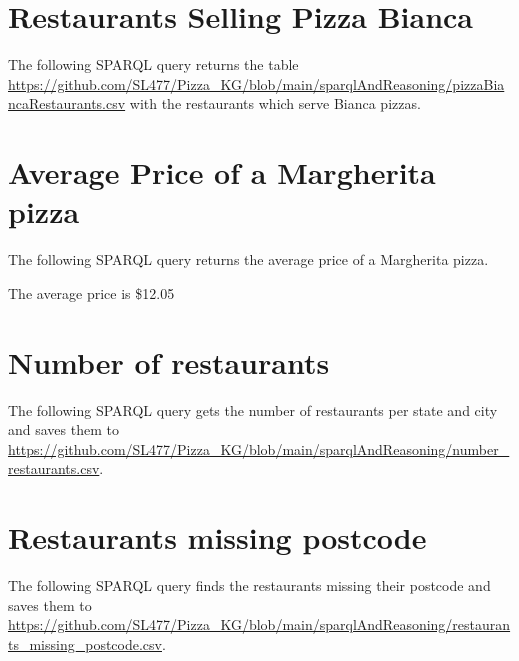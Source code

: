 \documentclass[11pt]{report} %
\begin{document}
\section{Restaurants Selling Pizza Bianca}
The following SPARQL query returns the table \url{https://github.com/SL477/Pizza_KG/blob/main/sparqlAndReasoning/pizzaBiancaRestaurants.csv} with the restaurants which serve Bianca pizzas.




\section{Average Price of a Margherita pizza}

The following SPARQL query returns the average price of a Margherita pizza.



The average price is \$12.05

\section{Number of restaurants}

The following SPARQL query gets the number of restaurants per state and city and saves them to \url{https://github.com/SL477/Pizza_KG/blob/main/sparqlAndReasoning/number_restaurants.csv}.



\section{Restaurants missing postcode}

The following SPARQL query finds the restaurants missing their postcode and saves them to \url{https://github.com/SL477/Pizza_KG/blob/main/sparqlAndReasoning/restaurants_missing_postcode.csv}.


\end{document}
